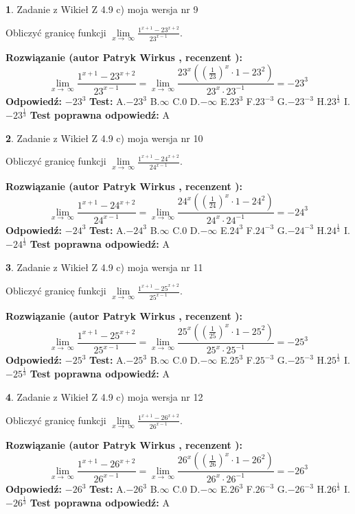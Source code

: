 \documentclass[12pt, a4paper]{article}
\theoremstyle{definition} %
\newtheorem{zad}{}
\newcommand{\zadStart}[1]{\begin{zad}#1\newline}
\newcommand{\zadStop}{\end{zad}}
\newcommand{\rozwStart}[2]{\noindent \textbf{Rozwiązanie (autor #1 , recenzent #2): }\newline}
\newcommand{\rozwStop}{\newline}
\newcommand{\odpStart}{\noindent \textbf{Odpowiedź:}\newline}
\newcommand{\odpStop}{\newline}
\newcommand{\testStart}{\noindent \textbf{Test:}\newline}
\newcommand{\testStop}{\newline}
\newcommand{\kluczStart}{\noindent \textbf{Test poprawna odpowiedź:}\newline}
\newcommand{\kluczStop}{\newline}
\begin{document}
\zadStart{Zadanie z Wikieł Z 4.9 c) moja wersja nr 9}


Obliczyć granicę funkcji  $\lim\limits_{x\to\ \infty}\frac{1^{x+1}-23^{x+2}}{23^{x-1}}$.
\zadStop
\rozwStart{Patryk Wirkus}{}
$$\lim\limits_{x\to\ \infty}\frac{1^{x+1}-23^{x+2}}{23^{x-1}}=\lim\limits_{x\to\ \infty}\frac{23^{x}((\frac{1}{23})^{x}\cdot 1 -23^{2})}{23^{x}\cdot 23^{-1}} = -23^{3}$$
\rozwStop
\odpStart
$-23^{3}$
\odpStop
\testStart
A.$-23^{3}$ B.$\infty$ C.$0$ D.$-\infty$ E.$23^{3}$
F.$23^{-3}$ G.$-23^{-3}$
H.$23^{\frac{1}{3}}$
I.$-23^{\frac{1}{3}}$
\testStop
\kluczStart
A
\kluczStop



\zadStart{Zadanie z Wikieł Z 4.9 c) moja wersja nr 10}


Obliczyć granicę funkcji  $\lim\limits_{x\to\ \infty}\frac{1^{x+1}-24^{x+2}}{24^{x-1}}$.
\zadStop
\rozwStart{Patryk Wirkus}{}
$$\lim\limits_{x\to\ \infty}\frac{1^{x+1}-24^{x+2}}{24^{x-1}}=\lim\limits_{x\to\ \infty}\frac{24^{x}((\frac{1}{24})^{x}\cdot 1 -24^{2})}{24^{x}\cdot 24^{-1}} = -24^{3}$$
\rozwStop
\odpStart
$-24^{3}$
\odpStop
\testStart
A.$-24^{3}$ B.$\infty$ C.$0$ D.$-\infty$ E.$24^{3}$
F.$24^{-3}$ G.$-24^{-3}$
H.$24^{\frac{1}{3}}$
I.$-24^{\frac{1}{3}}$
\testStop
\kluczStart
A
\kluczStop



\zadStart{Zadanie z Wikieł Z 4.9 c) moja wersja nr 11}


Obliczyć granicę funkcji  $\lim\limits_{x\to\ \infty}\frac{1^{x+1}-25^{x+2}}{25^{x-1}}$.
\zadStop
\rozwStart{Patryk Wirkus}{}
$$\lim\limits_{x\to\ \infty}\frac{1^{x+1}-25^{x+2}}{25^{x-1}}=\lim\limits_{x\to\ \infty}\frac{25^{x}((\frac{1}{25})^{x}\cdot 1 -25^{2})}{25^{x}\cdot 25^{-1}} = -25^{3}$$
\rozwStop
\odpStart
$-25^{3}$
\odpStop
\testStart
A.$-25^{3}$ B.$\infty$ C.$0$ D.$-\infty$ E.$25^{3}$
F.$25^{-3}$ G.$-25^{-3}$
H.$25^{\frac{1}{3}}$
I.$-25^{\frac{1}{3}}$
\testStop
\kluczStart
A
\kluczStop



\zadStart{Zadanie z Wikieł Z 4.9 c) moja wersja nr 12}


Obliczyć granicę funkcji  $\lim\limits_{x\to\ \infty}\frac{1^{x+1}-26^{x+2}}{26^{x-1}}$.
\zadStop
\rozwStart{Patryk Wirkus}{}
$$\lim\limits_{x\to\ \infty}\frac{1^{x+1}-26^{x+2}}{26^{x-1}}=\lim\limits_{x\to\ \infty}\frac{26^{x}((\frac{1}{26})^{x}\cdot 1 -26^{2})}{26^{x}\cdot 26^{-1}} = -26^{3}$$
\rozwStop
\odpStart
$-26^{3}$
\odpStop
\testStart
A.$-26^{3}$ B.$\infty$ C.$0$ D.$-\infty$ E.$26^{3}$
F.$26^{-3}$ G.$-26^{-3}$
H.$26^{\frac{1}{3}}$
I.$-26^{\frac{1}{3}}$
\testStop
\kluczStart
A
\kluczStop
\end{document}
